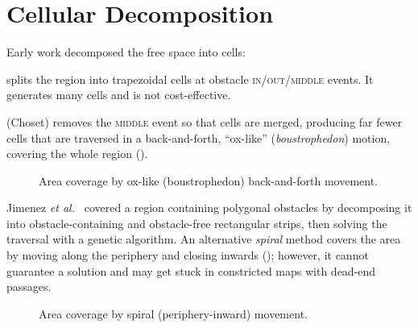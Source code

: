 \section{Cellular Decomposition}
Early work decomposed the free space into cells:
\begin{description}[leftmargin=1.6em,style=nextline]
  \item[Trapezoidal decomposition] splits the region into trapezoidal cells at
    obstacle \textsc{in}/\textsc{out}/\textsc{middle} events. It generates many
    cells and is not cost-effective.
  \item[Boustrophedon decomposition] (Choset) removes the \textsc{middle} event
    so that cells are merged, producing far fewer cells that are traversed in a
    back-and-forth, ``ox-like'' (\emph{boustrophedon}) motion, covering the whole
    region ().
\end{description}

\begin{figure}[H]
\centering
{}
\caption{Area coverage by ox-like (boustrophedon) back-and-forth movement.}
\label{fig:ox}
\end{figure}

Jimenez \emph{et al.}~\cite{jimenez2007} covered a region containing polygonal
obstacles by decomposing it into obstacle-containing and obstacle-free
rectangular strips, then solving the traversal with a genetic algorithm. An
alternative \emph{spiral} method covers the area by moving along the periphery
and closing inwards (); however, it cannot guarantee a solution
and may get stuck in constricted maps with dead-end passages.

\begin{figure}[H]
\centering
{}
\caption{Area coverage by spiral (periphery-inward) movement.}
\label{fig:spiral}
\end{figure}

